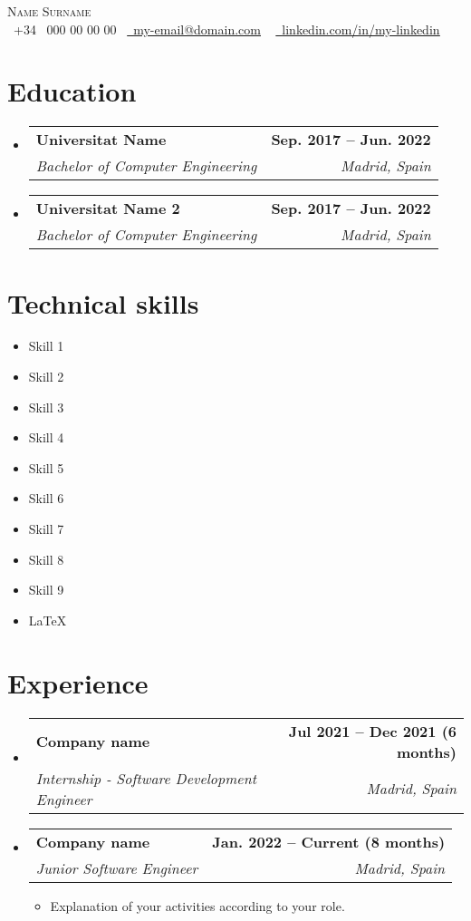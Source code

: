\documentclass[letterpaper,11pt]{article}
\makeatletter
\def\name{Name}
\def\surname{Surname}
\def\phonePrefix{34}
\def\phone{000 00 00 00}
\def\email{\ul{my-email@domain.com}}
\def\linkedin{\ul{linkedin.com/in/my-linkedin}}
\newcommand{\resumeItem}[1]{
	\item\small{
		{#1 \vspace{-2pt}}
	}
}
\newcommand{\resumeSubheading}[4]{
	\vspace{-2pt}\item
	\begin{tabular*}{1.0\textwidth}[t]{l@{\extracolsep{\fill}}r}
		\textbf{#1} & \textbf{\small #2} \\
		\textit{\small#3} & \textit{\small #4} \\
	\end{tabular*}\vspace{-7pt}
}
\newcommand{\resumeSubHeadingListStart}{\begin{itemize}[leftmargin=0.0in, label={}]}
\newcommand{\resumeSubHeadingListEnd}{\end{itemize}}
\newcommand{\resumeItemListStart}{\begin{itemize}}
\newcommand{\resumeItemListEnd}{\end{itemize}\vspace{-20pt}}
\makeatother
\begin{document}
	\begin{center}
		{\Huge \scshape {\color{nameColor}\name} \surname} \\ \vspace{1pt}
		\vspace{0.4cm}
		\small \raisebox{-0.1\height}{\color{symbolsColor}{\faPhone}}\ +\phonePrefix ~ \phone ~ \href{mailto:email@mail.com}{\raisebox{-0.2\height}{\color{symbolsColor}{\faEnvelope}}\  {\email}} ~ 
		\href{https://linkedin.com/in//}{\raisebox{-0.2\height}{\color{symbolsColor}{\faLinkedin}}\ {\linkedin}}  ~
		\vspace{0.2cm}
	\end{center}

	\section{Education}
	\resumeSubHeadingListStart
		\resumeSubheading
			{Universitat Name}{Sep. 2017 -- Jun. 2022}
			{Bachelor of Computer Engineering}{Madrid, Spain}
		\resumeSubheading
			{Universitat Name 2}{Sep. 2017 -- Jun. 2022}
			{Bachelor of Computer Engineering}{Madrid, Spain}
	\resumeSubHeadingListEnd
	
	\section{Technical skills}
	\begin{multicols}{2}
	\begin{itemize}[itemsep=1pt, parsep=3pt]
		\item Skill 1
		\item Skill 2
		\item Skill 3
		\item Skill 4
		\item Skill 5
		\item Skill 6
		\item Skill 7
		\item Skill 8
		\item Skill 9
		\item \LaTeX
	\end{itemize}
	\end{multicols}
	
	\section{Experience}
		\resumeSubHeadingListStart
			\resumeSubheading
				{Company name}{Jul 2021 -- Dec 2021 (6 months)}
				{Internship - Software Development Engineer}{Madrid, Spain}
			\resumeSubheading
				{Company name}{Jan. 2022 -- Current (8 months)}
				{Junior Software Engineer}{Madrid, Spain}
			\resumeItemListStart
				\resumeItem{Explanation of your activities according to your role. }
			\resumeItemListEnd
		\resumeSubHeadingListEnd
\end{document}
